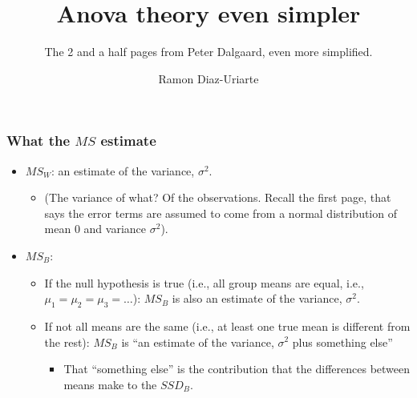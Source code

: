 \documentclass[bigger]{beamer}
\author{Ramon Diaz-Uriarte}
\title{Anova theory even simpler}
\subtitle{The 2 and a half pages from Peter Dalgaard, even more simplified.}
\begin{document}
 \maketitle


  




\begin{frame}
  \frametitle{What the $MS$ estimate}
  \begin{itemize}
  \item $MS_W$: an estimate of the variance, $\sigma^2$.
    \begin{itemize}
    \item {\tiny (The variance of what? Of the observations. Recall the
        first page, that says the error terms are assumed to come from a normal
        distribution of mean 0 and variance $\sigma^2$).}
    \end{itemize}

    \vspace*{20pt}
  \item $MS_B$:
    \begin{itemize}
    \item If the null hypothesis is true (i.e., all group means are equal, i.e.,
      $\mu_1 = \mu_2 = \mu_3 = \ldots$): $MS_B$ is also an estimate of the variance,
      $\sigma^2$.
          \vspace*{10pt}
    \item If not all means are the same (i.e., at least one true mean is
      different from the rest):  $MS_B$ is ``an estimate of the
      variance, $\sigma^2$ plus something else''
      \begin{itemize}
      \item That ``something else'' is the contribution that the differences
        between means make to the $SSD_B$. 
      \end{itemize}
    \end{itemize}
  \end{itemize}
\end{frame}
\end{document}

